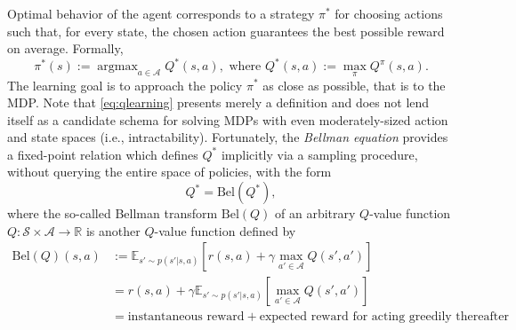 \documentclass[10pt,letterpaper]{article}
\DeclareMathOperator{\argmax}{argmax}
\begin{document}
Optimal behavior of the agent corresponds to
a strategy $\pi^*$ for choosing actions such that, for every state, the chosen action guarantees the best possible reward on average. Formally,
\begin{equation}
  \pi^*(s) := \argmax_{a \in \mathcal A}{Q}^*(s, a),\text{ where }Q^*(s, a) := \max_{\pi}Q^\pi(s,a).
  \label{eq:qlearning}
\end{equation}
The learning goal is to approach the
policy $\pi^*$ as close as possible, that is to  the MDP.
Note that \eqref{eq:qlearning} presents merely a definition and
does not lend itself as a candidate schema
for solving MDPs with even moderately-sized action and state spaces
(i.e., intractability).
Fortunately, the \textit{Bellman equation} \citep{sutton1998reinforcement} provides a fixed-point relation which defines $Q^*$ implicitly via a sampling procedure, without querying the entire space of policies, with the form
\begin{equation}
  Q^* = \text{Bel}(Q^*),
  \label{eq:bellman}
\end{equation}
where the so-called Bellman transform $\text{Bel}(Q)$
of an arbitrary $Q$-value function $Q: \mathcal S \times \mathcal A \rightarrow \mathbb R$  is another $Q$-value function defined by
\begin{equation}
  \begin{split}
   \text{Bel}(Q)(s,a) &:=
   \mathbb E_{s' \sim p(s'|s,a)} [r(s,a) + \gamma \max_{a' \in \mathcal A}Q(s', a')]\\
   &= r(s,a) + \gamma\mathbb E_{s' \sim p(s'|s,a)} [\max_{a' \in \mathcal A}Q(s', a')]\\
   &= \text{instantaneous reward} + \text{expected reward for acting greedily thereafter}
    \end{split}
  \end{equation}
\end{document}
